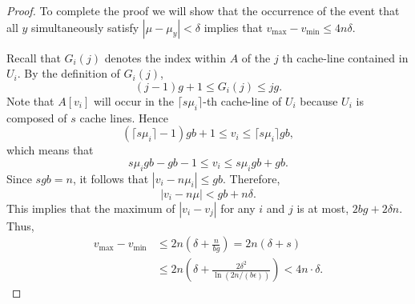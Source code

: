 \documentclass[11pt]{article}
\theoremstyle{remark}
\theoremstyle{remark}
\begin{document}
\begin{proof}


To complete the proof we will show that the occurrence of the event
that all $y$ simultaneously satisfy $|\mu - \mu_y| < \delta$ implies
that $v_{\text{max}} - v_{\text{min}} \le 4n\delta$.




  Recall that $G_i(j)$ denotes the index within $A$ of the $j$ th cache-line contained in $U_i$. By the definition of $G_i(j)$, $$(j - 1)g + 1 \le G_i(j) \le jg.$$ Note that $A[v_i]$ will occur in the $\lceil s\mu_i \rceil$-th cache-line of $U_i$ because $U_i$ is composed of $s$ cache lines. Hence $$(\lceil s\mu_i \rceil - 1) g b + 1 \le v_i \le \lceil s\mu_i \rceil g b,$$
  which means that
  $$s\mu_i g b - gb - 1 \le v_i \le s\mu_i g b + gb.$$ Since $sgb =
  n$, it follows that $|v_i - n \mu_i| \le gb$. Therefore,
  $$|v_i - n \mu| < gb + n\delta.$$
  This
implies that the maximum of $|v_i - v_j|$ for
any $i$ and $j$ is at most, $2bg + 2\delta n$. Thus,
\begin{align*}
  v_{\text{max}} - v_{\text{min}} & \le 2n \left( \delta + \frac{n}{bg} \right)  = 2n \left( \delta + s \right) \\
  & \le 2n \left(\delta + \frac{2\delta^2}{\ln (2n / (b\epsilon))}\right) < 4n\cdot\delta.
\end{align*}
\end{proof}
\end{document}

